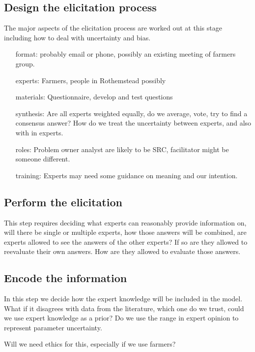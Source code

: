 \documentclass[12pt, a4paper]{article}
\begin{document}
\subsection{Design the elicitation process}
The major aspects of the elicitation process are worked out at this stage including how to deal with uncertainty and bias. 
\begin{enumerate}
	\item[format:] probably email or phone, possibly an existing meeting of farmers group.
	\item[experts:] Farmers, people in Rothemstead possibly
	\item[materials:] Questionnaire, develop and test questions
	\item[synthesis:] Are all experts weighted equally, do we average, vote, try to find a consensus answer? How do we treat the uncertainty between experts, and also with in experts.
	\item[roles:] Problem owner analyst are likely to be SRC, facilitator might be someone different.
	\item[training:] Experts may need some guidance on meaning and our intention.    
\end{enumerate}

\subsection{Perform the elicitation}
This step requires deciding what experts can reasonably provide information on, will there be single or multiple experts, how those answers will be combined, are experts allowed to see the answers of the other experts? If so are they allowed to reevaluate their own answers. How are they allowed to evaluate those answers.  

\subsection{Encode the information}
In this step we decide how the expert knowledge will be included in the model. What if it disagrees with data from the literature, which one do we trust, could we use expert knowledge as a prior? Do we use the range in expert opinion to represent parameter uncertainty. 

Will we need ethics for this, especially if we use farmers?

 

\end{document}
